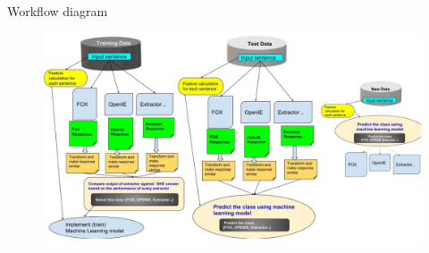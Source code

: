 \begin{frame}{Workflow diagram}
\begin{figure}[htbp]
	\centering
	\includegraphics[width=1.05\textwidth]{figures/final2}
\end{figure}
\end{frame}